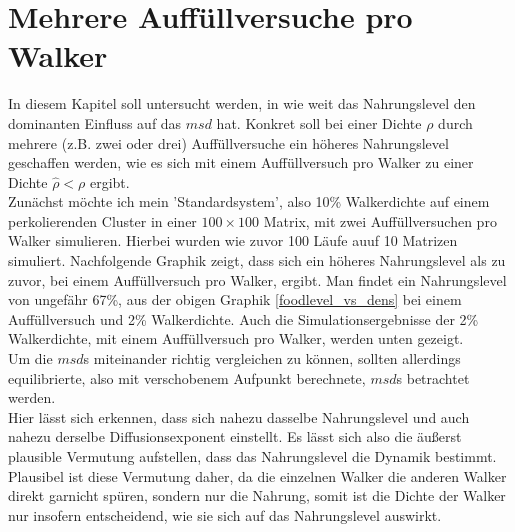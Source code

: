 \documentclass[a4paper, 12pt]{report}
\begin{document}
\section{Mehrere Auffüllversuche pro Walker}
In diesem Kapitel soll untersucht werden, in wie weit das Nahrungslevel den dominanten Einfluss auf das $msd$ hat. Konkret soll bei einer Dichte $\rho$ durch mehrere (z.B. zwei oder drei) Auffüllversuche ein höheres Nahrungslevel geschaffen werden, wie es sich mit einem Auffüllversuch pro Walker zu einer Dichte $\hat{\rho}<\rho$ ergibt.
\\
Zunächst möchte ich mein 'Standardsystem', also 10\% Walkerdichte auf einem perkolierenden Cluster in einer $100\times100$ Matrix, mit zwei Auffüllversuchen pro Walker simulieren. Hierbei wurden wie zuvor 100 Läufe auuf 10 Matrizen simuliert. Nachfolgende Graphik zeigt, dass sich ein höheres Nahrungslevel als zu zuvor, bei einem Auffüllversuch pro Walker, ergibt. Man findet ein Nahrungslevel von ungefähr 67\%, aus der obigen Graphik \ref{foodlevel_vs_dens} bei einem Auffüllversuch und 2\% Walkerdichte. Auch die Simulationsergebnisse der 2\% Walkerdichte, mit einem Auffüllversuch pro Walker, werden unten gezeigt.
\\
Um die $msd$s miteinander richtig vergleichen zu können, sollten allerdings equilibrierte, also mit verschobenem Aufpunkt berechnete, $msd$s betrachtet werden.
\\
Hier lässt sich erkennen, dass sich nahezu dasselbe Nahrungslevel und auch nahezu derselbe Diffusionsexponent einstellt. Es lässt sich also die äußerst plausible Vermutung aufstellen, dass das Nahrungslevel die Dynamik bestimmt. Plausibel ist diese Vermutung daher, da die einzelnen Walker die anderen Walker direkt garnicht spüren, sondern nur die Nahrung, somit ist die Dichte der Walker nur insofern entscheidend, wie sie sich auf das Nahrungslevel auswirkt.
\end{document}
